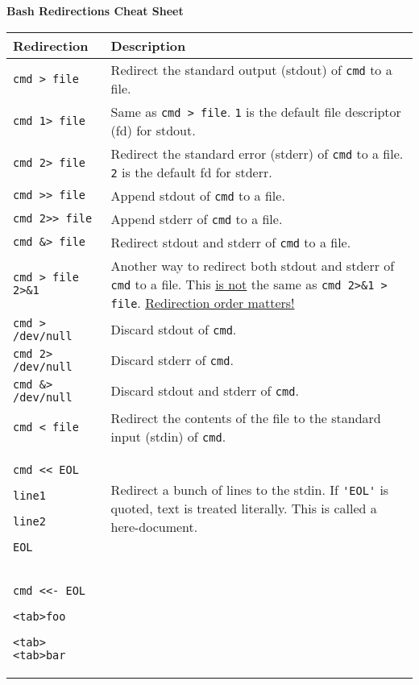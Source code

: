 \documentclass[9pt]{memoir}
\begin{document}
\begin{center}
\huge \textbf{Bash Redirections Cheat Sheet}
\end{center}

\vspace{0.1in}

\renewcommand{\arraystretch}{1.2}
\begin{tabular}{|m{5.5cm}|m{12.2cm}|}
\hline
\large\textbf{Redirection} & \large\textbf{Description} \\
\hline
\verb|cmd > file| & Redirect the standard output (stdout) of \verb|cmd| to a file. \\
\hline
\verb|cmd 1> file| & Same as \verb|cmd > file|. \verb|1| is the default file descriptor (fd) for stdout. \\
\hline
\verb|cmd 2> file| & Redirect the standard error (stderr) of \verb|cmd| to a file. \verb|2| is the default fd for stderr. \\
\hline
\verb|cmd >> file| & Append stdout of \verb|cmd| to a file. \\
\hline
\verb|cmd 2>> file| & Append stderr of \verb|cmd| to a file. \\
\hline
\verb|cmd &> file| & Redirect stdout and stderr of \verb|cmd| to a file. \\
\hline
\verb|cmd > file 2>&1| & Another way to redirect both stdout and stderr of \verb|cmd| to a file. This \underline{is not} the same as \verb|cmd 2>&1 > file|. \underline{Redirection order matters!} \\
\hline
\verb|cmd > /dev/null| & Discard stdout of \verb|cmd|. \\
\hline
\verb|cmd 2> /dev/null| & Discard stderr of \verb|cmd|. \\
\hline
\verb|cmd &> /dev/null| & Discard stdout and stderr of \verb|cmd|. \\
\hline
\verb|cmd < file| & Redirect the contents of the file to the standard input (stdin) of \verb|cmd|. \\
\hline
\small{
\verb|cmd << EOL| \par
\verb|line1| \par
\verb|line2| \par
\verb|EOL|
} & Redirect a bunch of lines to the stdin. If \verb|'EOL'| is quoted, text is treated literally. This is called a here-document. \\
\hline
\small{
\verb|cmd <<- EOL| \par
\verb|<tab>foo| \par
\verb|<tab><tab>bar| \par
}
\end{tabular}
\end{document}
